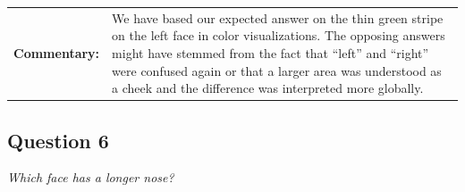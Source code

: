 \begin{tabular}{l p{}}
	{\bf Commentary:} & We have based our expected answer on the thin green stripe on the left face in color visualizations. The opposing answers might have stemmed from the fact that ``left'' and ``right'' were confused again or that a larger area was understood as a cheek and the difference was interpreted more globally. \\
\end{tabular}

\clearpage

\subsection{Question 6}
\label{attch:complete_study_results-question6}

\begin{center}{\it Which face has a longer nose?}\end{center}


